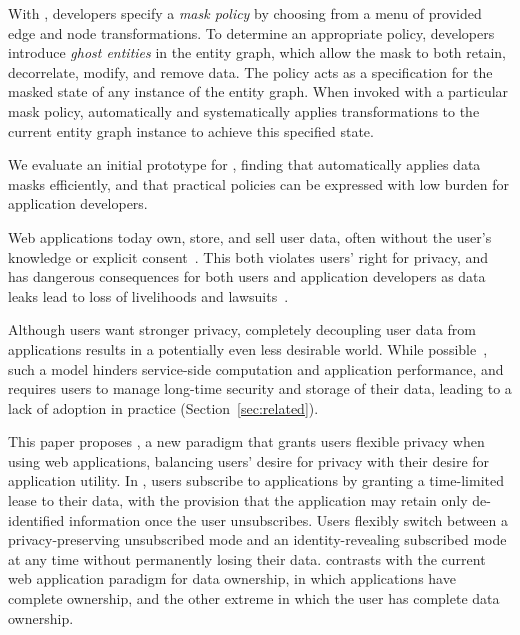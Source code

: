 With \sys, developers specify a \emph{mask policy} by choosing from a menu of provided edge and node
transformations. To determine an appropriate policy, developers introduce \emph{ghost entities} in the entity graph, which allow the mask to both retain, decorrelate, modify,
and remove data. The policy acts as a specification for the masked state of any instance of the
entity graph. When invoked with a particular mask policy, \sys automatically and systematically
applies transformations to the current entity graph instance to achieve this specified state.

We evaluate an initial prototype for \sys, finding that \sys automatically applies
data masks efficiently, and that practical policies can be expressed with low burden for application
developers.
\fi

\iffalse
%
%
Web applications today own, store, and sell user data, often without the user's knowledge or
explicit consent~\cite{nytimes:fb, npr:data}. This both violates users' right for privacy, and has
dangerous consequences for both users and application developers as data leaks lead to loss of
livelihoods and lawsuits~\cite{breach:amazon,breach:twitter, breach:fb, breach:marriott,
breach:quora}.

Although users want stronger privacy, completely decoupling user data from applications results in a
potentially even less desirable world. While possible~\cite{solid, amber, w5, blockstack, bstore}, such a
model hinders service-side computation and application performance, and requires users to manage
long-time security and storage of their data, leading to a lack of adoption in practice (Section~\ref{sec:related}).

This paper proposes \name, a new paradigm that grants users flexible privacy when using web
applications, balancing users' desire for privacy with their desire for application utility. In
\name, users subscribe to applications by granting a time-limited lease to their data, with the
provision that the application may retain only de-identified information once the user unsubscribes.
Users flexibly switch between a privacy-preserving unsubscribed mode and an identity-revealing
subscribed mode at any time without permanently losing their data. \name contrasts
with the current web application paradigm for data ownership, in which applications have complete
ownership, and the other extreme in which the user has complete data ownership.%

